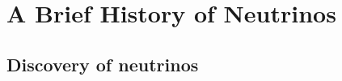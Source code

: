 

\ifpdf
    \graphicspath{{Chapter2/Figs/Raster/}{Chapter2/Figs/PDF/}{Chapter2/Figs/}}
\else
    \graphicspath{{Chapter2/Figs/Vector/}{Chapter2/Figs/}}
\fi

\chapter{A Brief History of Neutrinos}\label{Chp:ABfriefHistoryOfNeutrinos} 

\section{Discovery of neutrinos}
